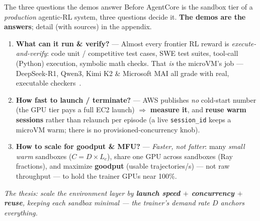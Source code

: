 \documentclass[aspectratio=169]{beamer}
\begin{document}
\begin{frame}{The three questions the demos answer}
  \footnotesize Before AgentCore is the sandbox tier of a \emph{production} agentic-RL system, three
  questions decide it. \textbf{The demos are the answers}; detail (with sources) in the appendix.
  \vspace{0.3em}
  \begin{enumerate}\setlength\itemsep{0.55em}
    \item[\textbf{1}] \textbf{What can it run \& verify?} --- Almost every frontier RL reward is
      \emph{execute-and-verify}: code unit / competitive test cases, SWE test suites, tool-call (Python)
      execution, symbolic math checks. That \emph{is} the microVM's job --- DeepSeek-R1, Qwen3, Kimi K2
      \& Microsoft MAI all grade with real, executable checkers~\cite{deepseekr1,qwen3,kimik2}.
    \item[\textbf{2}] \textbf{How fast to launch / terminate?} --- AWS publishes \emph{no} cold-start
      number (the GPU tier pays a full EC2 launch) $\Rightarrow$ \textbf{measure it}, and \textbf{reuse
      warm sessions} rather than relaunch per episode (a live \texttt{session\_id} keeps a microVM warm;
      there is no provisioned-concurrency knob).
    \item[\textbf{3}] \textbf{How to scale for goodput \& MFU?} --- \emph{Faster, not fatter}: many
      \emph{small warm} sandboxes ($C = D \times L_e$), share one GPU across sandboxes (Ray fractions),
      and maximize \textbf{goodput} (usable trajectories/s) --- not raw throughput --- to hold the
      trainer GPUs near 100\%.
  \end{enumerate}
  \vspace{0.2em}
  {\scriptsize\itshape The thesis: scale the environment layer by \textbf{launch speed $+$ concurrency
  $+$ reuse}, keeping each sandbox minimal --- the trainer's demand rate $D$ anchors everything.}
\end{frame}
\end{document}
